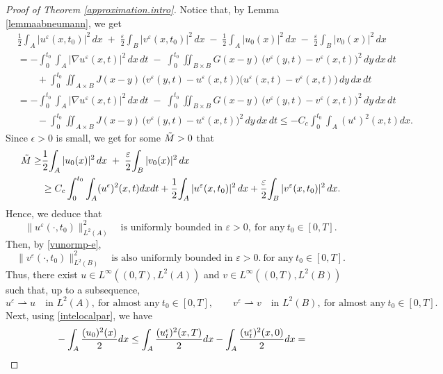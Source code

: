 \documentclass[10pt,a4paper]{amsart}
\begin{document}
\begin{proof}[Proof of Theorem \ref{approximation.intro}]
Notice that, by Lemma \ref{lemmaabneumann}, we get
\begin{align*}
&\frac12\!\int_A |u^\varepsilon(x,{t_0})|^2\,dx
\;+\;
\frac{\varepsilon}{2}\!\int_B |v^\varepsilon(x,{t_0})|^2\,dx
\;-\;
\frac12\!\int_A |u_0(x)|^2\,dx
\;-\;
\frac{\varepsilon}{2}\!\int_B |v_0(x)|^2\,dx
\\[0.6em]
&=
-\int_{0}^{{t_0}}\!\!\int_A |\nabla u^\varepsilon(x,t)|^2\,dx\,dt
\;-\;
\int_{0}^{{t_0}}\!\!\iint_{B\times B}
   G(x-y)\,\big( v^\varepsilon(y,t)-v^\varepsilon(x,t) \big)^2
\,dy\,dx\,dt
\\
&\qquad
+\int_{0}^{{t_0}}\!\!\iint_{A\times B}
   J(x-y)\,\big( v^\varepsilon(y,t)-u^\varepsilon(x,t) \big)
           \big( u^\varepsilon(x,t)-v^\varepsilon(x,t) \big)
\,dy\,dx\,dt
\\[0.6em]
&=
-\int_{0}^{{t_0}}\!\!\int_A |\nabla u^\varepsilon(x,t)|^2\,dx\,dt
\;-\;
\int_{0}^{{t_0}}\!\!\iint_{B\times B}
   G(x-y)\,\big( v^\varepsilon(y,t)-v^\varepsilon(x,t) \big)^2
\,dy\,dx\,dt
\\
&\qquad
-\int_{0}^{{t_0}}\!\!\iint_{A\times B}
   J(x-y)\,\big( v^\varepsilon(y,t)-u^\varepsilon(x,t) \big)^2
\,dy\,dx\,dt\leq -C_c\int_0^{t_0}\int_A (u^\epsilon)^2(x,t)dx.
\end{align*}
Since $\epsilon>0$ is small, we get for some $\Tilde{M}>0$ that
\begin{align*}
     \Tilde{M}\geq &
\frac12\!\int_A |u_0(x)|^2\,dx
\;+\;
\frac{\varepsilon}{2}\!\int_B |v_0(x)|^2\,dx \\ & \geq  C_c\int_0^{t_0}\int_A (u^\epsilon)^2(x,t)dxdt + \frac12\!\int_A |u^\varepsilon(x,{t_0})|^2\,dx
+
\frac{\varepsilon}{2}\!\int_B |v^\varepsilon(x,{t_0})|^2\,dx.
\end{align*}
Hence, we deduce that
\[ 
\|u^\varepsilon(\cdot,t_0)\|_{L^2(A)}^2
\quad\text{is uniformly bounded in }\varepsilon>0, \ \text{for any} \ t_0 \in [0,T].
\]
Then, by \eqref{vunormp-e},
\[
\|v^\varepsilon(\cdot,t_0)\|_{L^2(B)}^2
\quad\text{is also uniformly bounded in }\varepsilon>0.\ \text{for any} \ t_0 \in [0,T].
\]
Thus, there exist $u\in L^\infty ((0,T), L^2(A))$ and $v\in L^\infty ((0,T), L^2(B))$ such that, up to a subsequence,
\[
u^\varepsilon \rightharpoonup u \quad\text{in }L^2(A), \ \text{for almost any} \ t_0 \in [0,T], 
\qquad
v^\varepsilon \rightharpoonup v \quad\text{in }L^2(B), \ \text{for almost any} \ t_0 \in [0,T].
\]
\medskip
Next, using \eqref{intelocalpar}, we have
\begin{align*}
    &-\int_A \frac{(u_0)^2(x)}{2}dx\leq \int_A \frac{(u^\epsilon_t)^2(x,T)}{2}dx-\int_A \frac{(u^\epsilon_t)^2(x,0)}{2}dx=\notag \\

\end{align*}
\end{proof}
\end{document}
